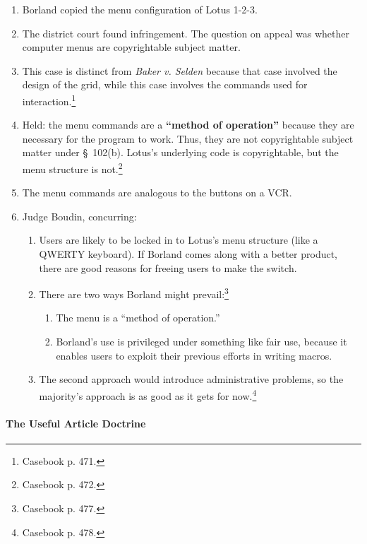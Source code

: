 \begin{enumerate}
    \item Borland copied the menu configuration of Lotus 1-2-3.
    \item The district court found infringement. The question on appeal was 
    whether computer menus are copyrightable subject matter.
    \item This case is distinct from \emph{Baker v. Selden} because that case 
    involved the design of the grid, while this case involves the commands 
    used for interaction.\footnote{Casebook p. 471.}
    \item Held: the menu commands are a \textbf{``method of operation''} 
    because they are necessary for the program to work. Thus, they are not 
    copyrightable subject matter under \S\ 102(b). Lotus's underlying code is 
    copyrightable, but the menu structure is not.\footnote{Casebook p. 472.}
    \item The menu commands are analogous to the buttons on a VCR.
    \item Judge Boudin, concurring:
    \begin{enumerate}
        \item Users are likely to be locked in to Lotus's menu structure (like 
        a QWERTY keyboard). If Borland comes along with a better product, 
        there are good reasons for freeing users to make the switch.
        \item There are two ways Borland might prevail:\footnote{Casebook p. 
        477.}
        \begin{enumerate}
            \item The menu is a ``method of operation.''
            \item Borland's use is privileged under something like fair use, 
            because it enables users to exploit their previous efforts in 
            writing macros.
        \end{enumerate}
        \item The second approach would introduce administrative problems, so 
        the majority's approach is as good as it gets for 
        now.\footnote{Casebook p. 478.}
    \end{enumerate}
\end{enumerate}

\paragraph{The Useful Article Doctrine}

